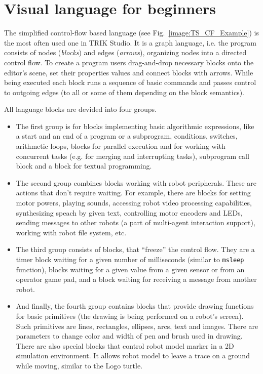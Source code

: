 \documentclass[conference]{IEEEtran}
\begin{document}
\section{Visual language for beginners}
\label{chapter:controlFlowLanguage}

The simplified control-flow based language (see Fig.~\ref{image:TS_CF_Example}) is the most often used one in TRIK Studio. It is a graph language, i.e. the program consists of nodes (\textit{blocks}) and edges (\textit{arrows}), organizing nodes into a directed control flow. To create a program users drag-and-drop necessary blocks onto the editor's scene, set their properties values and connect blocks with arrows. While being executed each block runs a sequence of basic commands and passes control to outgoing edges (to all or some of them depending on the block semantics). 

All language blocks are devided into four groups.

\begin{itemize}
    \item The first group is for blocks implementing basic algorithmic expressions, like a start and an end of a program or a subprogram, conditions, switches, arithmetic loops, blocks for parallel execution and for working with concurrent tasks (e.g. for merging and interrupting tasks), subprogram call block and a block for textual programming.
    \item The second group combines blocks working with robot peripherals. These are actions that don't require waiting. For example, there are blocks for setting motor powers, playing sounds, accessing robot video processing capabilities, synthesizing speach by given text, controlling motor encoders and LEDs, sending messages to other robots (a part of multi-agent interaction support), working with robot file system, etc.
    \item The third group consists of blocks, that ``freeze'' the control flow. They are a timer block waiting for a given number of milliseconds (similar to \texttt{msleep} function), blocks waiting for a given value from a given sensor or from an operator game pad, and a block waiting for receiving a message from another robot. 
    \item And finally, the fourth group contains blocks that provide drawing functions for basic primitives (the drawing is being performed on a robot's screen). Such primitives are lines, rectangles, ellipses, arcs, text and images. There are parameters to change color and width of pen and brush used in drawing. There are also special blocks that control robot model marker in a 2D simulation environment. It allows robot model to leave a trace on a ground while moving, similar to the Logo turtle.
\end{itemize}
\end{document}
